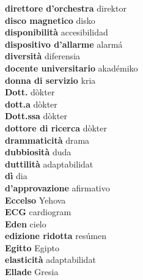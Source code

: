 \textbf{ direttore d’orchestra  } direktor \\
\textbf{ disco magnetico  } disko \\
\textbf{ disponibilità  } accesibilidad \\
\textbf{ dispositivo d’allarme  } alarmá \\
\textbf{ diversità  } diferensia \\
\textbf{ docente universitario  } akadémiko \\
\textbf{ donna di servizio  } kria \\
\textbf{ Dott.  } dòkter \\
\textbf{ dott.a  } dòkter \\
\textbf{ Dott.ssa  } dòkter \\
\textbf{ dottore di ricerca  } dòkter \\
\textbf{ drammaticità  } drama \\
\textbf{ dubbiosità  } duda \\
\textbf{ duttilità  } adaptabilidat \\
\textbf{ dì  } dia \\
\textbf{ d’approvazione  } afirmativo \\
\textbf{ Eccelso  } Yehova \\
\textbf{ ECG  } cardiogram \\
\textbf{ Eden  } cielo \\
\textbf{ edizione ridotta  } resúmen \\
\textbf{ Egitto  } Egipto \\
\textbf{ elasticità  } adaptabilidat \\
\textbf{ Ellade  } Gresia \\
